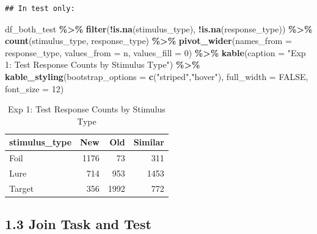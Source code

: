 \documentclass[
]{article}
\newenvironment{Shaded}{\begin{snugshade}}{\end{snugshade}}
\newcommand{\AttributeTok}[1]{\textcolor[rgb]{0.13,0.29,0.53}{#1}}
\newcommand{\ConstantTok}[1]{\textcolor[rgb]{0.56,0.35,0.01}{#1}}
\newcommand{\DecValTok}[1]{\textcolor[rgb]{0.00,0.00,0.81}{#1}}
\newcommand{\FunctionTok}[1]{\textcolor[rgb]{0.13,0.29,0.53}{\textbf{#1}}}
\newcommand{\NormalTok}[1]{#1}
\newcommand{\SpecialCharTok}[1]{\textcolor[rgb]{0.81,0.36,0.00}{\textbf{#1}}}
\newcommand{\StringTok}[1]{\textcolor[rgb]{0.31,0.60,0.02}{#1}}
\begin{document}
\begin{verbatim}
## In test only:
\end{verbatim}

\begin{Shaded}
\begin{Highlighting}[]
\NormalTok{df\_both\_test }\SpecialCharTok{\%\textgreater{}\%}
  \FunctionTok{filter}\NormalTok{(}\SpecialCharTok{!}\FunctionTok{is.na}\NormalTok{(stimulus\_type), }\SpecialCharTok{!}\FunctionTok{is.na}\NormalTok{(response\_type)) }\SpecialCharTok{\%\textgreater{}\%}
  \FunctionTok{count}\NormalTok{(stimulus\_type, response\_type) }\SpecialCharTok{\%\textgreater{}\%}
  \FunctionTok{pivot\_wider}\NormalTok{(}\AttributeTok{names\_from =}\NormalTok{ response\_type, }\AttributeTok{values\_from =}\NormalTok{ n, }\AttributeTok{values\_fill =} \DecValTok{0}\NormalTok{) }\SpecialCharTok{\%\textgreater{}\%}
  \FunctionTok{kable}\NormalTok{(}\AttributeTok{caption =} \StringTok{"Exp 1: Test Response Counts by Stimulus Type"}\NormalTok{) }\SpecialCharTok{\%\textgreater{}\%}
  \FunctionTok{kable\_styling}\NormalTok{(}\AttributeTok{bootstrap\_options =} \FunctionTok{c}\NormalTok{(}\StringTok{"striped"}\NormalTok{,}\StringTok{"hover"}\NormalTok{), }\AttributeTok{full\_width =} \ConstantTok{FALSE}\NormalTok{, }\AttributeTok{font\_size =} \DecValTok{12}\NormalTok{)}
\end{Highlighting}
\end{Shaded}

\begingroup\fontsize{12}{14}\selectfont

\begin{longtable}[t]{lrrr}
\caption{\label{tab:exp1_response_table}Exp 1: Test Response Counts by Stimulus Type}\\
\toprule
stimulus\_type & New & Old & Similar\\
\midrule
Foil & 1176 & 73 & 311\\
Lure & 714 & 953 & 1453\\
Target & 356 & 1992 & 772\\
\bottomrule
\end{longtable}
\endgroup{}

\subsection{1.3 Join Task and Test}\label{join-task-and-test}
\end{document}
